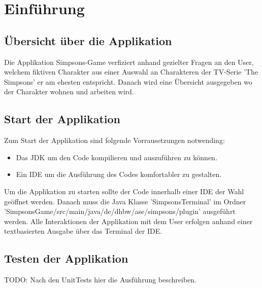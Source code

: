 \chapter{Einführung}

\section{Übersicht über die Applikation}
Die Applikation Simpsons-Game verfiziert anhand gezielter Fragen an den User, welchem fiktiven Charakter aus einer Auswahl an Charakteren der TV-Serie 'The Simpsons' er am ehesten entspricht. Danach wird eine Übersicht ausgegeben wo der Charakter wohnen und arbeiten wird. 
\section{Start der Applikation}
Zum Start der Applikation sind folgende Vorrausetzungen notwending:
\begin{itemize}
    \item Das \ac{JDK} um den Code kompilieren und auszuführen zu können.
    \item Ein \ac{IDE} um die Ausführung des Codes komfortabler zu gestalten.
\end{itemize}
Um die Applikation zu starten sollte der Code innerhalb einer \ac{IDE} der Wahl geöffnet werden. Danach muss die Java Klasse 'SimpsonsTerminal' im Ordner 'SimpsonsGame/src/main/java/de/dhbw/ase/simpsons/plugin' ausgeführt werden. Alle Interaktionen der Applikation mit dem User erfolgen anhand einer textbasierten Ausgabe über das Terminal der \ac{IDE}.


\section{Testen der Applikation}
TODO: Nach den UnitTests hier die Ausführung beschreiben.
